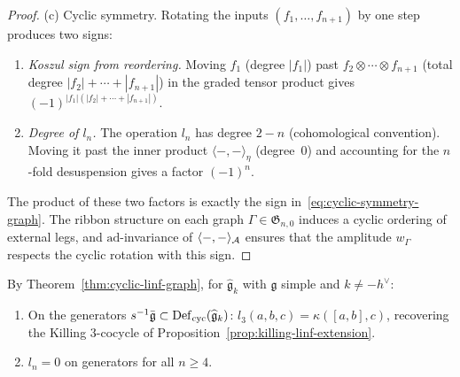 \begin{proof}
(c)\enspace
Cyclic symmetry.  Rotating the inputs $(f_1, \ldots, f_{n+1})$
by one step produces two signs:
\begin{enumerate}
\item \emph{Koszul sign from reordering.}  Moving
  $f_1$ (degree $|f_1|$) past
  $f_2 \otimes \cdots \otimes f_{n+1}$
  (total degree $|f_2| + \cdots + |f_{n+1}|$) in the
  graded tensor product gives $(-1)^{|f_1|(|f_2|+\cdots+|f_{n+1}|)}$.
\item \emph{Degree of $l_n$.}  The operation $l_n$ has degree
  $2 - n$ (cohomological convention).  Moving it past the inner
  product $\langle{-},{-}\rangle_\eta$ (degree~$0$) and
  accounting for the $n$-fold desuspension gives a factor
  $(-1)^n$.
\end{enumerate}
The product of these two factors is exactly the sign
in~\eqref{eq:cyclic-symmetry-graph}.  The ribbon structure
on each graph $\Gamma \in \mathfrak{G}_{n,0}$ induces a cyclic
ordering of external legs, and $\mathrm{ad}$-invariance of
$\langle{-},{-}\rangle_{\mathcal{A}}$ ensures that the amplitude
$w_\Gamma$ respects the cyclic rotation with this sign.
\end{proof}

\begin{corollary}\label{cor:killing-recovery-graph}
By Theorem~\textup{\ref{thm:cyclic-linf-graph}},
for $\widehat{\mathfrak{g}}_k$ with $\mathfrak{g}$ simple and
$k \neq -h^\vee$:
\begin{enumerate}[label=\textup{(\roman*)}]
\item On the generators
  $s^{-1}\bar{\mathfrak{g}} \subset \operatorname{Def}_{\mathrm{cyc}}(\widehat{\mathfrak{g}}_k)$:
  $l_3(a,b,c) = \kappa([a,b],c)$, recovering the Killing $3$-cocycle of
  Proposition~\textup{\ref{prop:killing-linf-extension}}.
\item $l_n = 0$ on generators for all $n \geq 4$.
\end{enumerate}
\end{corollary}

